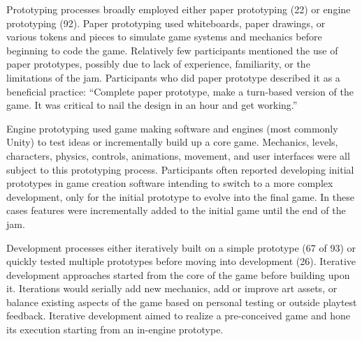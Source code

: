 \documentclass{sig-alternate}
\begin{document}

Prototyping processes broadly employed either paper prototyping (22) or engine prototyping (92).
Paper prototyping used whiteboards, paper drawings, or various tokens and pieces to simulate game systems and mechanics before beginning to code the game. Relatively few participants mentioned the use of paper prototypes, possibly due to lack of experience, familiarity, or the limitations of the jam. Participants who did paper prototype described it as a beneficial practice:
``Complete paper prototype, make a turn-based version of the game. It was critical to nail the design in an hour and get working.''

Engine prototyping used game making software and engines (most commonly Unity) to test ideas or incrementally build up a core game. Mechanics, levels, characters, physics, controls, animations, movement, and user interfaces were all subject to this prototyping process. 
Participants often reported developing initial prototypes in game creation software intending to switch to a more complex development, only for the initial prototype to evolve into the final game. In these cases features were incrementally added to the initial game until the end of the jam.

Development processes either iteratively built on a simple prototype (67 of 93) or quickly tested multiple prototypes before moving into development (26).
Iterative development approaches started from the core of the game before building upon it. Iterations would serially add new mechanics, add or improve art assets, or balance existing aspects of the game based on personal testing or outside playtest feedback.
Iterative development aimed to realize a pre-conceived game and hone its execution starting from an in-engine prototype.
\end{document}
